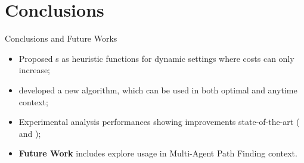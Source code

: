 \section*{Conclusions}

\begin{frame}{Conclusions and Future Works}
    \begin{itemize}
        \item Proposed \CPD{}s as heuristic functions for dynamic settings where costs can only increase;
        \medskip
        \item developed a new algorithm, \CPDSearch{} which can be used in both optimal and anytime context;
        \medskip
        \item Experimental analysis performances showing improvements \wrt{} state-of-the-art (\ALT{} and \AWA{});
        \medskip
        \item \textbf{Future Work} includes explore \CPD{} usage in Multi-Agent Path Finding context.
    \end{itemize}
\end{frame}